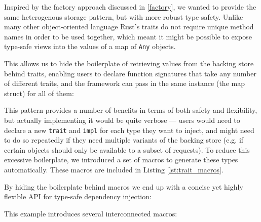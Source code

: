 \documentclass[sigconf]{acmart}
\def\code#1{\lstinline{#1}}
\begin{document}
Inspired by the factory approach discussed in \ref{factory}, we wanted to provide the same heterogenous storage pattern, but with more robust type safety. Unlike many other object-oriented language Rust's traits do not require unique method names in order to be used together, which meant it might be possible to expose type-safe views into the values of a map of \code{Any} objects.

\begin{minipage}{\linewidth}

\end{minipage}

This allows us to hide the boilerplate of retrieving values from the backing store behind traits, enabling users to declare function signatures that take any number of different traits, and the framework can pass in the same instance (the map struct) for all of them:

\begin{minipage}{\linewidth}

\end{minipage}

This pattern provides a number of benefits in terms of both safety and flexibility, but actually implementing it would be quite verbose --- users would need to declare a new \code{trait} and \code{impl} for each type they want to inject, and might need to do so repeatedly if they need multiple variants of the backing store (e.g. if certain objects should only be available to a subset of requests). To reduce this excessive boilerplate, we introduced a set of macros to generate these types automatically. These macros are included in Listing \ref{lst:trait_macros}.



By hiding the boilerplate behind macros we end up with a concise yet highly flexible API for type-safe dependency injection:

\begin{minipage}{\linewidth}

\end{minipage}

This example introduces several interconnected macros:
\end{document}
